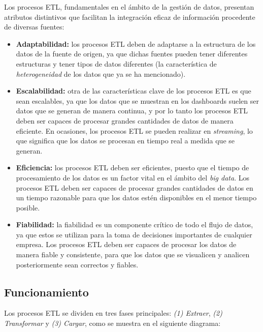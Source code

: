 Los procesos ETL, fundamentales en el ámbito de la gestión de datos, presentan atributos
distintivos que facilitan la integración eficaz de información procedente de diversas fuentes:

\begin{itemize}
	\item \textbf{Adaptabilidad:} los procesos ETL deben de adaptarse a la estructura de los
		datos de la fuente de origen, ya que dichas fuentes pueden tener diferentes estructuras
		y tener tipos de datos diferentes (la característica de \textit{heterogeneidad} de los
		datos que ya se ha mencionado).
	\item \textbf{Escalabilidad:} otra de las características clave de los procesos ETL es que sean
		escalables, ya que los datos que se muestran en los dashboards suelen ser datos que se generan
		de manera continua, y por lo tanto los procesos ETL deben ser capaces de procesar grandes
		cantidades de datos de manera eficiente. En ocasiones, los procesos ETL se pueden realizar en
		\textit{streaming}, lo que significa que los datos se procesan en tiempo real a medida que se
		generan.
	\item \textbf{Eficiencia:} los procesos ETL deben ser eficientes, puesto que el tiempo de procesamiento
		de los datos es un factor vital en el ámbito del \textit{big data}. Los procesos ETL deben ser
		capaces de procesar grandes cantidades de datos en un tiempo razonable para que los datos estén
		disponibles en el menor tiempo posible.
	\item \textbf{Fiabilidad:} la fiabilidad es un componente crítico de todo el flujo de datos, ya que estos
		se utilizan para la toma de decisiones importantes de cualquier empresa. Los procesos ETL deben
		ser capaces de procesar los datos de manera fiable y consistente, para que los datos que se visualicen y
		analicen posteriormente sean correctos y fiables.
\end{itemize}

\newpage{}
\subsection{Funcionamiento}
Los procesos ETL se dividen en tres fases principales: \textit{(1) Extraer}, \textit{(2) Transformar} y
\textit{(3) Cargar}, como se muestra en el siguiente diagrama:

